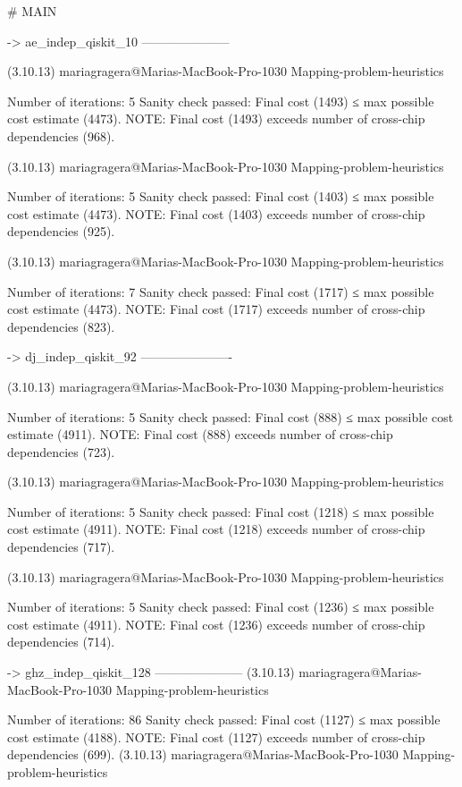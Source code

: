 # MAIN

-> ae_indep_qiskit_10
---------------------

(3.10.13) mariagragera@Marias-MacBook-Pro-1030 Mapping-problem-heuristics %

Number of iterations: 5
Sanity check passed: Final cost (1493) ≤ max possible cost estimate (4473).
NOTE: Final cost (1493) exceeds number of cross-chip dependencies (968).

(3.10.13) mariagragera@Marias-MacBook-Pro-1030 Mapping-problem-heuristics %

Number of iterations: 5
Sanity check passed: Final cost (1403) ≤ max possible cost estimate (4473).
NOTE: Final cost (1403) exceeds number of cross-chip dependencies (925).

(3.10.13) mariagragera@Marias-MacBook-Pro-1030 Mapping-problem-heuristics %

Number of iterations: 7
Sanity check passed: Final cost (1717) ≤ max possible cost estimate (4473).
NOTE: Final cost (1717) exceeds number of cross-chip dependencies (823).

-> dj_indep_qiskit_92
----------------------

(3.10.13) mariagragera@Marias-MacBook-Pro-1030 Mapping-problem-heuristics %

Number of iterations: 5
Sanity check passed: Final cost (888) ≤ max possible cost estimate (4911).
NOTE: Final cost (888) exceeds number of cross-chip dependencies (723).

(3.10.13) mariagragera@Marias-MacBook-Pro-1030 Mapping-problem-heuristics %

Number of iterations: 5
Sanity check passed: Final cost (1218) ≤ max possible cost estimate (4911).
NOTE: Final cost (1218) exceeds number of cross-chip dependencies (717).

(3.10.13) mariagragera@Marias-MacBook-Pro-1030 Mapping-problem-heuristics %

Number of iterations: 5
Sanity check passed: Final cost (1236) ≤ max possible cost estimate (4911).
NOTE: Final cost (1236) exceeds number of cross-chip dependencies (714).

-> ghz_indep_qiskit_128
---------------------
(3.10.13) mariagragera@Marias-MacBook-Pro-1030 Mapping-problem-heuristics %

Number of iterations: 86
Sanity check passed: Final cost (1127) ≤ max possible cost estimate (4188).
NOTE: Final cost (1127) exceeds number of cross-chip dependencies (699).
(3.10.13) mariagragera@Marias-MacBook-Pro-1030 Mapping-problem-heuristics %

